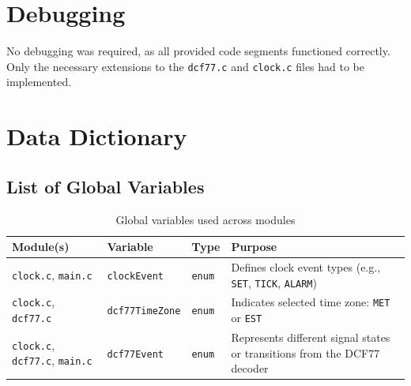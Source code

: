 \documentclass[a4paper,12pt]{article}
\begin{document}
\newpage


\section{Debugging}

No debugging was required, as all provided code segments functioned correctly.  
Only the necessary extensions to the \texttt{dcf77.c} and \texttt{clock.c} files had to be implemented.

\newpage


\section{Data Dictionary}


\subsection{List of Global Variables}

\begin{table}[H]
\centering
\renewcommand{\arraystretch}{1.3}
\begin{tabularx}{\textwidth}{|L{3.5cm}|L{2.8cm}|L{1.8cm}|X|}
\hline
\textbf{Module(s)} & \textbf{Variable} & \textbf{Type} & \textbf{Purpose} \\
\hline
\texttt{clock.c}, \texttt{main.c} & \texttt{clockEvent} & \texttt{enum} & Defines clock event types (e.g., \texttt{SET}, \texttt{TICK}, \texttt{ALARM}) \\
\hline
\texttt{clock.c}, \texttt{dcf77.c} & \texttt{dcf77TimeZone} & \texttt{enum} & Indicates selected time zone: \texttt{MET} or \texttt{EST} \\
\hline
\texttt{clock.c}, \texttt{dcf77.c}, \texttt{main.c} & \texttt{dcf77Event} & \texttt{enum} & Represents different signal states or transitions from the DCF77 decoder \\
\hline
\end{tabularx}
\caption{Global variables used across modules}
\end{table}

\end{document}
